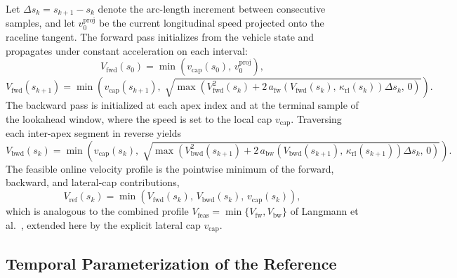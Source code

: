 Let $\Delta s_k = s_{k+1} - s_k$ denote the arc-length increment between consecutive samples, and let $v_0^{\text{proj}}$ be the current longitudinal speed projected onto the raceline tangent.
The forward pass initializes from the vehicle state and propagates under constant acceleration on each interval:
\begin{equation}
    V_{\text{fwd}}(s_0) = \min\!\left(v_{\text{cap}}(s_0),\, v_0^{\text{proj}}\right),
    \label{eq:vfwdInit}
\end{equation}
\begin{equation}
    V_{\text{fwd}}(s_{k+1}) = \min\!\left(
        v_{\text{cap}}(s_{k+1}),\;
        \sqrt{\max\!\left(V_{\text{fwd}}^2(s_k) + 2\, a_{\text{fw}}\!\left(V_{\text{fwd}}(s_k),\, \kappa_{\text{rl}}(s_k)\right) \Delta s_k,\, 0\right)}
    \right).
    \label{eq:vfwdStep}
\end{equation}
The backward pass is initialized at each apex index and at the terminal sample of the lookahead window, where the speed is set to the local cap $v_{\text{cap}}$.
Traversing each inter-apex segment in reverse yields
\begin{equation}
    V_{\text{bwd}}(s_k) = \min\!\left(
        v_{\text{cap}}(s_k),\;
        \sqrt{\max\!\left(V_{\text{bwd}}^2(s_{k+1}) + 2\, a_{\text{bw}}\!\left(V_{\text{bwd}}(s_{k+1}),\, \kappa_{\text{rl}}(s_{k+1})\right) \Delta s_k,\, 0\right)}
    \right).
    \label{eq:vbwdStep}
\end{equation}
The feasible online velocity profile is the pointwise minimum of the forward, backward, and lateral-cap contributions,
\begin{equation}
    V_{\text{ref}}(s_k) = \min\!\left(V_{\text{fwd}}(s_k),\, V_{\text{bwd}}(s_k),\, v_{\text{cap}}(s_k)\right),
    \label{eq:vFeasible}
\end{equation}
which is analogous to the combined profile $V_{\text{feas}} = \min\{V_{\text{fw}}, V_{\text{bw}}\}$ of Langmann et al.\ \cite{langmann_OnlineVelocityProfile_2025}, extended here by the explicit lateral cap $v_{\text{cap}}$.

\subsection{Temporal Parameterization of the Reference}

